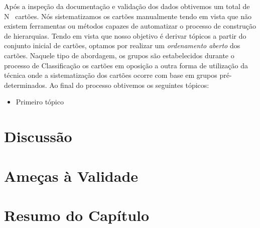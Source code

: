 Após a inspeção da documentação e validação dos dados obtivemos um total de
N~ cartões. Nós
sistematizamos os cartões manualmente tendo em vista que não existem ferramentas
ou métodos capazes de automatizar o processo de construção de hierarquias. Tendo
em vista que nosso objetivo é derivar tópicos a partir do conjunto inicial de
cartões, optamos por realizar um \textit{ordenamento aberto} dos cartões.
Naquele tipo de abordagem, os grupos são estabelecidos durante o processo de
Classificação os cartões em oposição a outra forma de utilização da técnica onde
a sistematização dos cartões ocorre com base em grupos pré-determinados.  Ao
final do processo obtivemos os seguintes tópicos:

\begin{itemize}
	\item Primeiro tópico
\end{itemize}

\section{Discussão}
\label{sec:discussao}

\section{Ameças à Validade}
\label{sec:ameacas_a_validade}


\section{Resumo do Capítulo}
\label{sec:resumo_do_capitulo}